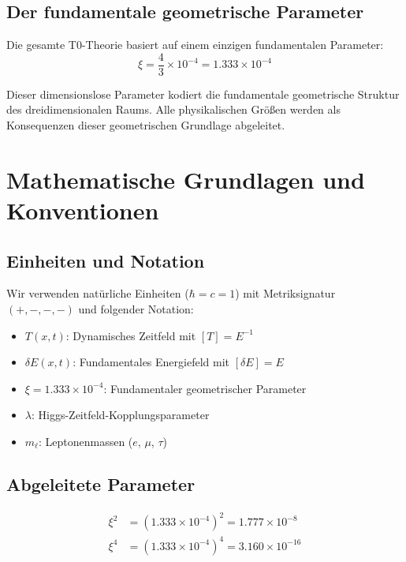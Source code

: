 \documentclass[12pt,a4paper]{article}
\begin{document}
	\subsection{Der fundamentale geometrische Parameter}
	
	\begin{keyresult}
		Die gesamte T0-Theorie basiert auf einem einzigen fundamentalen Parameter:
		\begin{equation}
			\boxed{\xi = \frac{4}{3} \times 10^{-4} = 1.333 \times 10^{-4}}
		\end{equation}
		
		Dieser dimensionslose Parameter kodiert die fundamentale geometrische Struktur des dreidimensionalen Raums. Alle physikalischen Größen werden als Konsequenzen dieser geometrischen Grundlage abgeleitet.
	\end{keyresult}
	
	\section{Mathematische Grundlagen und Konventionen}
	
	\subsection{Einheiten und Notation}
	
	Wir verwenden natürliche Einheiten ($\hbar = c = 1$) mit Metriksignatur $(+,-,-,-)$ und folgender Notation:
	
	\begin{itemize}
		\item $T(x,t)$: Dynamisches Zeitfeld mit $[T] = E^{-1}$
		\item $\delta E(x,t)$: Fundamentales Energiefeld mit $[\delta E] = E$
		\item $\xi = 1.333 \times 10^{-4}$: Fundamentaler geometrischer Parameter
		\item $\lambda$: Higgs-Zeitfeld-Kopplungsparameter
		\item $m_\ell$: Leptonenmassen ($e$, $\mu$, $\tau$)
	\end{itemize}
	
	\subsection{Abgeleitete Parameter}
	
	\begin{align}
		\xi^2 &= (1.333 \times 10^{-4})^2 = 1.777 \times 10^{-8} \\
		\xi^4 &= (1.333 \times 10^{-4})^4 = 3.160 \times 10^{-16} 
	\end{align}
	
\end{document}
